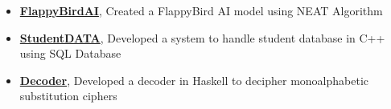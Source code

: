 

\begin{itemize}
\item \textbf{\href{https://github.com/RohitRanjangit/FlappyBirdAI}{FlappyBirdAI}}, Created a FlappyBird AI model using NEAT Algorithm
\item \textbf{\href{https://github.com/RohitRanjangit/StudentData}{StudentDATA}}, Developed a system to handle student database in C++ using SQL Database
\item \textbf{\href{https://github.com/RohitRanjangit/Decoder}{Decoder}}, Developed a decoder in Haskell to decipher monoalphabetic substitution ciphers
\end{itemize}

